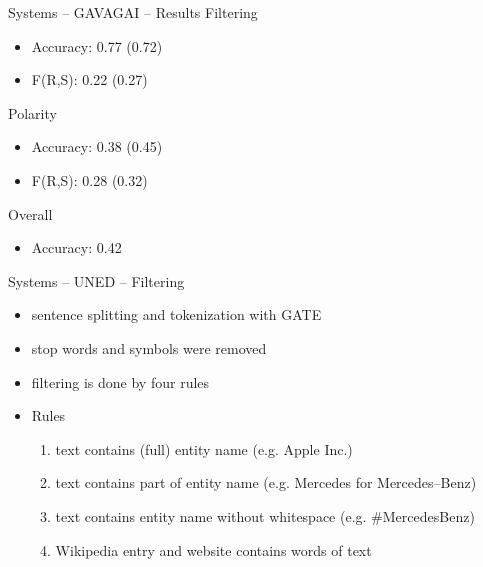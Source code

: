 \documentclass[12pt,a4paper]{beamer}
\begin{document}
\begin{frame}{Systems -- GAVAGAI -- Results}
Filtering
\begin{itemize}
\item Accuracy: 0.77 (0.72)
\item F(R,S): 0.22 (0.27)
\end{itemize}
Polarity
\begin{itemize}
\item Accuracy: 0.38 (0.45)
\item F(R,S): 0.28 (0.32)
\end{itemize}
Overall
\begin{itemize}
\item Accuracy: 0.42
\end{itemize}

\end{frame}






\begin{frame}{Systems -- UNED -- Filtering \cite{uned}}
\begin{itemize}
\item sentence splitting and tokenization with GATE
\item stop words and symbols were removed
\item filtering is done by four rules
\end{itemize}
\begin{itemize}
\item Rules
\begin{enumerate}
\item text contains (full) entity name (e.g. Apple Inc.)
\item text contains part of entity name (e.g. Mercedes for Mercedes--Benz)
\item text contains entity name without whitespace (e.g. \#MercedesBenz)
\item Wikipedia entry and website contains words of text
\end{enumerate}
\end{itemize}
\end{frame}
\end{document}
